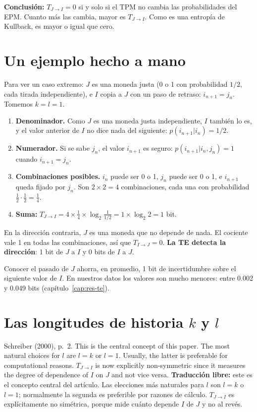 \documentclass[11pt,openany]{book}
\begin{document}
\textbf{Conclusión:} $T_{J\to I}=0$ si y solo si el TPM no cambia las probabilidades del EPM. Cuanto más las cambia, mayor es $T_{J\to I}$. Como es una entropía de Kullback, es mayor o igual que cero.

\section{Un ejemplo hecho a mano}

Para ver un caso extremo: $J$ es una moneda justa (0 o 1 con probabilidad $1/2$, cada tirada independiente), e $I$ copia a $J$ con un paso de retraso: $i_{n+1} = j_n$. Tomemos $k = l = 1$.

\begin{enumerate}
\item \textbf{Denominador.} Como $J$ es una moneda justa independiente, $I$ también lo es, y el valor anterior de $I$ no dice nada del siguiente: $p(i_{n+1}|i_n) = 1/2$.
\item \textbf{Numerador.} Si se sabe $j_n$, el valor $i_{n+1}$ es seguro: $p(i_{n+1}|i_n, j_n) = 1$ cuando $i_{n+1} = j_n$.
\item \textbf{Combinaciones posibles.} $i_n$ puede ser 0 o 1, $j_n$ puede ser 0 o 1, e $i_{n+1}$ queda fijado por $j_n$. Son $2\times2 = 4$ combinaciones, cada una con probabilidad $\tfrac12\cdot\tfrac12 = \tfrac14$.
\item \textbf{Suma:} $T_{J\to I} = 4 \times \tfrac14 \times \log_2\frac{1}{1/2} = 1 \times \log_2 2 = 1$ bit.
\end{enumerate}

En la dirección contraria, $J$ es una moneda que no depende de nada. El cociente vale 1 en todas las combinaciones, así que $T_{I\to J} = 0$. \textbf{La TE detecta la dirección}: 1 bit de $J$ a $I$ y 0 bits de $I$ a $J$.

\begin{nota}
Conocer el pasado de $J$ ahorra, en promedio, 1 bit de incertidumbre sobre el siguiente valor de $I$. En nuestros datos los valores son mucho menores: entre 0.002 y 0.049 bits (capítulo~\ref{cap:res-te}).
\end{nota}

\section{Las longitudes de historia $k$ y $l$}

\begin{cita}{Schreiber (2000), p.~2.}
This is the central concept of this paper. The most natural choices for $l$ are $l = k$ or $l = 1$. Usually, the latter is preferable for computational reasons. $T_{J\to I}$ is now explicitly non-symmetric since it measures the degree of dependence of $I$ on $J$ and not vice versa.
\tcblower
\textbf{Traducción libre:} este es el concepto central del artículo. Las elecciones más naturales para $l$ son $l = k$ o $l = 1$; normalmente la segunda es preferible por razones de cálculo. $T_{J\to I}$ es explícitamente no simétrica, porque mide cuánto depende $I$ de $J$ y no al revés.
\end{cita}
\end{document}
